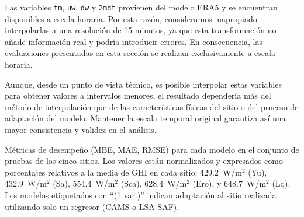 \documentclass[letterpaper,12pt, twoside]{report}
\providecommand{\DIFdeltex}[1]{{\protect\color{red} \scriptsize #1}} %
\providecommand{\DIFdelFL}[1]{\DIFdel{#1}} %
\providecommand{\DIFdel}[1]{\texorpdfstring{\DIFdeltex{#1}}{}} %
\begin{document}
\DIFdel{Las variables \texttt{tm}, \texttt{uw}, \texttt{dw} y \texttt{2mdt} provienen del modelo ERA5 y se encuentran disponibles a escala horaria. Por esta razón, consideramos inapropiado interpolarlas a una resolución de 15 minutos, ya que esta transformación no añade información real y podría introducir errores. En consecuencia, las evaluaciones presentadas en esta sección se realizan exclusivamente a escala horaria.
}%

\DIFdel{Aunque, desde un punto de vista técnico, es posible interpolar estas variables para obtener valores a intervalos menores, el resultado dependería más del método de interpolación que de las características físicas del sitio o del proceso de adaptación del modelo. Mantener la escala temporal original garantiza así una mayor consistencia y validez en el análisis.}%

{%
\DIFdelFL{Métricas de desempeño (MBE, MAE, RMSE) para cada modelo en el conjunto de pruebas de los cinco sitios. Los valores están normalizados y expresados como porcentajes relativos a la media de GHI en cada sitio: 429.2~W/m$^2$ (Yu), 432.9~W/m$^2$ (Sa), 554.4~W/m$^2$ (Sca), 628.4~W/m$^2$ (Ero), y 648.7~W/m$^2$ (Lq). Los modelos etiquetados con ``(1 var.)'' indican adaptación al sitio realizada utilizando solo un regresor (CAMS o LSA-SAF).}}
\end{document}
